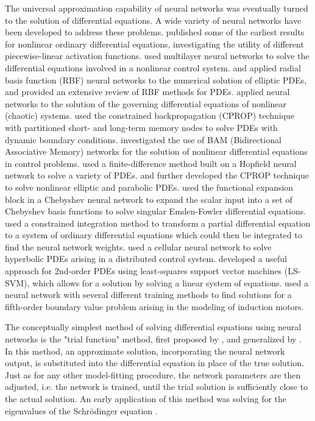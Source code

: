\documentclass{article}
\begin{document}
The universal approximation capability of neural networks was eventually turned to the solution of differential equations. A wide variety of neural networks have been developed to address these problems. \cite{Meade1994} published some of the earliest results for nonlinear ordinary differential equations, investigating the utility of different piecewise-linear activation functions. \cite{He2000} used multilayer neural networks to  solve the differential equations involved in a nonlinear control system. \cite{Jianyu2003} and \cite{Mai-Duy2001} applied radial basis function (RBF) neural networks to the numerical solution of elliptic PDEs, and \cite{Kumar2011} provided an extensive review of RBF methods for PDEs. \cite{Smaoui2004} applied neural networks to the solution of the governing differential equations of nonlinear (chaotic) systems. \cite{DiMuro2009} used the constrained backpropagation (CPROP) technique with partitioned short- and long-term memory nodes to solve PDEs with dynamic boundary conditions. \cite{Zhou2009} investigated the use of BAM (Bidirectional Associative Memory) networks for the solution of nonlinear differential equations in control problems. \cite{Alharbi2010} used a finite-difference method built on a Hopfield neural network to solve a variety of PDEs. \cite{Rudd2013} and \cite{Rudd2014} further developed the CPROP technique to solve nonlinear elliptic and parabolic PDEs. \cite{Mall2015} used the functional expansion block in a Chebyshev neural network to expand the scalar input into a set of Chebyshev basis functions to solve singular Emden-Fowler differential equations. \cite{Rudd2015} used a constrained integration method to transform a partial differential equation to a system of ordinary differential equations which could then be integrated to find the neural network weights. \cite{Danciu2015} used a cellular neural network to solve hyperbolic PDEs arising in a distributed control system. \cite{Mehrkanoon2015} developed a useful approach for 2nd-order PDEs using least-squares support vector machines (LS-SVM), which allows for a solution by solving a linear system of equations. \cite{Ahmad2018} used a neural network with several different training methods to find solutions for a fifth-order boundary value problem arising in the modeling of induction motors.

The conceptually simplest method of solving differential equations using neural networks is the "trial function" method, first proposed by \cite{vanMilligen1995}, and generalized by \cite{Lagaris1998}. In this method, an approximate solution, incorporating the neural network output, is substituted into the differential equation in place of the true solution. Just as for any other model-fitting procedure, the network parameters are then adjusted, i.e. the network is trained, until the trial solution is sufficiently close to the actual solution. An early application of this method was solving for the eigenvalues of the Schr\"odinger equation \cite{Lagaris1997}.
\end{document}
